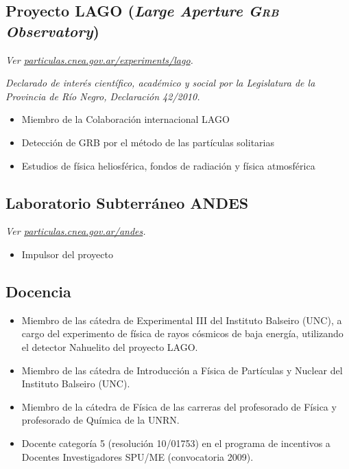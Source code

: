 \documentclass[11pt, a4paper]{article}
\begin{document}
\subsection*{Proyecto LAGO ({\emph{Large Aperture \textsc{Grb} Observatory}})}
\small\textit{Ver
\href{http://particulas.cnea.gov.ar/experiments/lago/}{particulas.cnea.gov.ar/experiments/lago}.
}

{\emph{Declarado de interés científico, académico y social por la Legislatura de la
Provincia de Río Negro, Declaración 42/2010.}}

\begin{itemize}
\item Miembro de la Colaboración internacional LAGO
\item Detección de GRB por el método de las partículas solitarias
\item Estudios de física heliosférica, fondos de radiación y física atmosférica
\end{itemize}

\subsection*{Laboratorio Subterráneo ANDES}
\small\textit{Ver
\href{http://particulas.cnea.gov.ar/andes}{particulas.cnea.gov.ar/andes}.
}
\begin{itemize}
\item Impulsor del proyecto
\end{itemize}

\subsection*{Docencia}
\begin{itemize}
\item Miembro de las cátedra de Experimental III del Instituto Balseiro (UNC),
a cargo del experimento de física de rayos cósmicos de baja energía, utilizando
el detector Nahuelito del proyecto LAGO. 
\item Miembro de las cátedra de Introducción a Física de Partículas y Nuclear
del Instituto Balseiro (UNC).
\item Miembro de la cátedra de Física de las carreras del profesorado de Física
y profesorado de Química de la UNRN.
\item Docente categoría 5 (resolución 10/01753) en el programa de incentivos a Docentes Investigadores SPU/ME (convocatoria 2009).
\end{itemize}
\end{document}
